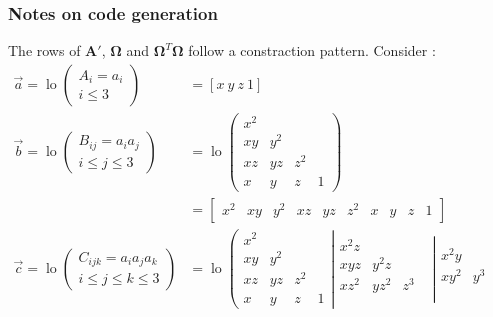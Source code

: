 \documentclass{article}
\def\mat#1{\mathbf{#1}}
\begin{document}
\subsubsection*{Notes on code generation}
The rows of $\mat{A'}$, $\mat{\Omega}$ and $\mat{\Omega}^T\mat{\Omega}$ follow a constraction pattern. Consider :
\begin{equation}
\begin{split}
\vec{a}= \operatorname{lo}\left(\begin{matrix}A_i=a_i\\ i \leq 3 \end{matrix}\right)
&=\left[x~y~z~1\right]\\
\vec{b}= \operatorname{lo}\left(\begin{matrix}B_{ij}=a_ia_j\\ i \leq j \leq 3 \end{matrix}\right)
&=\operatorname{lo}\left(\begin{matrix}
x^2 &     &     &   \\
xy  & y^2 &     &   \\
xz  & yz  & z^2 &   \\
x   & y   & z   & 1
\end{matrix}\right) \\
&= \left[\begin{matrix}
x^2 &
xy & y^2  &
xz & yz & z^2 & x & y & z & 1
\end{matrix}\right] \\
\vec{c}=\operatorname{lo}\left(\begin{matrix}C_{ijk}=a_ia_ja_k\\ i \leq j \leq k \leq 3 \end{matrix}\right)
&=\operatorname{lo}\left(\begin{matrix}
x^2 &     &     &   \\
xy  & y^2 &     &   \\
xz  & yz  & z^2 &   \\
x   & y   & z   & 1
\end{matrix}\right|
\left.\begin{matrix}
x^2z &      &       & \\
xyz  & y^2z &       & \\
xz^2 & yz^2 & z^3   & \\
     &      &       & 
\end{matrix}\right|
\left.\begin{matrix}
x^2y &      &  & \\
xy^2 & y^3  &  & \\

\end{matrix}
\end{split}
\end{equation}
\end{document}
